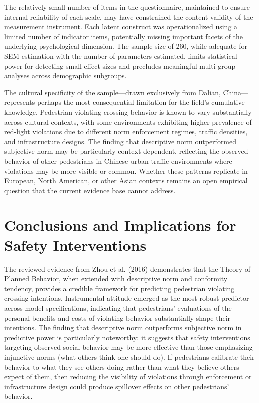 \documentclass{article}
\begin{document}
The relatively small number of items in the questionnaire, maintained to ensure internal reliability of each scale, may have constrained the content validity of the measurement instrument. Each latent construct was operationalized using a limited number of indicator items, potentially missing important facets of the underlying psychological dimension. The sample size of 260, while adequate for SEM estimation with the number of parameters estimated, limits statistical power for detecting small effect sizes and precludes meaningful multi-group analyses across demographic subgroups. \cite{08_2016_zhou_aap}

The cultural specificity of the sample—drawn exclusively from Dalian, China—represents perhaps the most consequential limitation for the field's cumulative knowledge. Pedestrian violating crossing behavior is known to vary substantially across cultural contexts, with some environments exhibiting higher prevalence of red-light violations due to different norm enforcement regimes, traffic densities, and infrastructure designs. The finding that descriptive norm outperformed subjective norm may be particularly context-dependent, reflecting the observed behavior of other pedestrians in Chinese urban traffic environments where violations may be more visible or common. Whether these patterns replicate in European, North American, or other Asian contexts remains an open empirical question that the current evidence base cannot address. \cite{08_2016_zhou_aap}

\section{Conclusions and Implications for Safety Interventions}
The reviewed evidence from Zhou et al. (2016) demonstrates that the Theory of Planned Behavior, when extended with descriptive norm and conformity tendency, provides a credible framework for predicting pedestrian violating crossing intentions. Instrumental attitude emerged as the most robust predictor across model specifications, indicating that pedestrians' evaluations of the personal benefits and costs of violating behavior substantially shape their intentions. The finding that descriptive norm outperforms subjective norm in predictive power is particularly noteworthy: it suggests that safety interventions targeting observed social behavior may be more effective than those emphasizing injunctive norms (what others think one should do). If pedestrians calibrate their behavior to what they see others doing rather than what they believe others expect of them, then reducing the visibility of violations through enforcement or infrastructure design could produce spillover effects on other pedestrians' behavior. \cite{08_2016_zhou_aap}
\end{document}
